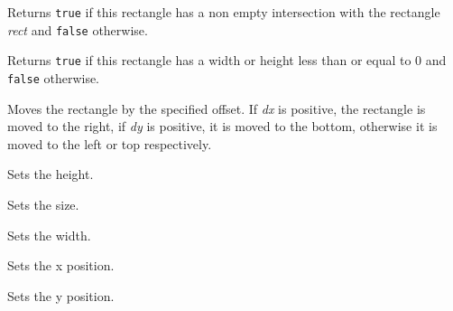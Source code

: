 \label{wxrectintersects}


Returns {\tt true} if this rectangle has a non empty intersection with the
rectangle {\it rect} and {\tt false} otherwise.


\label{wxrectisempty}


Returns {\tt true} if this rectangle has a width or height less than or equal to 
0 and {\tt false} otherwise.


\label{wxrectoffset}



Moves the rectangle by the specified offset. If {\it dx} is positive, the
rectangle is moved to the right, if {\it dy} is positive, it is moved to the
bottom, otherwise it is moved to the left or top respectively.


\label{wxrectsetheight}


Sets the height.


\label{wxrectsetsize}


Sets the size.




\label{wxrectsetwidth}


Sets the width.


\label{wxrectsetx}


Sets the x position.


\label{wxrectsety}


Sets the y position.


\label{wxrectunion}

